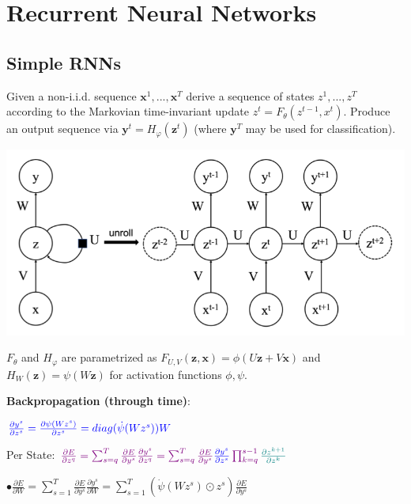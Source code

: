 \section*{Recurrent Neural Networks}
\color{black}
\subsection*{Simple RNNs}
Given a non-i.i.d. sequence $\mathbf x^1,...,\mathbf x^T$ derive a sequence of states $z^1, ..., z^T$ according to the Markovian time-invariant update $z^t = F_\theta(z^{t-1}, x^t)$. Produce an output sequence via $\mathbf y^t=H_\varphi(\mathbf z^t)$ (where $\mathbf y^T$ may be used for classification).

\includegraphics[width=.87\linewidth]{rnn_unrolled.png}

$F_\theta$ and $H_\varphi$ are parametrized as $F_{U,V}(\mathbf z, \mathbf x)=\phi(U\mathbf z+V\mathbf x)$ and $H_W(\mathbf z)=\psi(W\mathbf z)$ for activation functions $\phi, \psi$.
 
\textbf{Backpropagation (through time)}:


\hspace{47pt} $\color{blue}\frac{\partial y^s}{\partial z^s} = \frac{\partial \psi(W z^s)}{\partial z^{s}} = diag(\dot \psi(W z^s)) W$

Per State: $\color{violet}\frac{\partial E}{\partial z^q} = \sum_{s=q}^T \frac{\partial E}{\partial y^s} \frac{\partial y^s}{\partial z^q} = \sum_{s=q}^T \frac{\partial E}{\partial y^s} {\color{blue}\frac{\partial y^s}{\partial z^s}} \prod_{k=q}^{s-1} \color{teal}\frac{\partial z^{k+1}}{\partial z^k}$

$\bullet \frac{\partial E}{\partial W} = \sum_{s=1}^T \frac{\partial E}{\partial y^s} \frac{\partial y^s}{\partial W} = \sum_{s=1}^T (\Dot{\psi}(Wz^s) \odot z^s) \frac{\partial E}{\partial y^s}$

